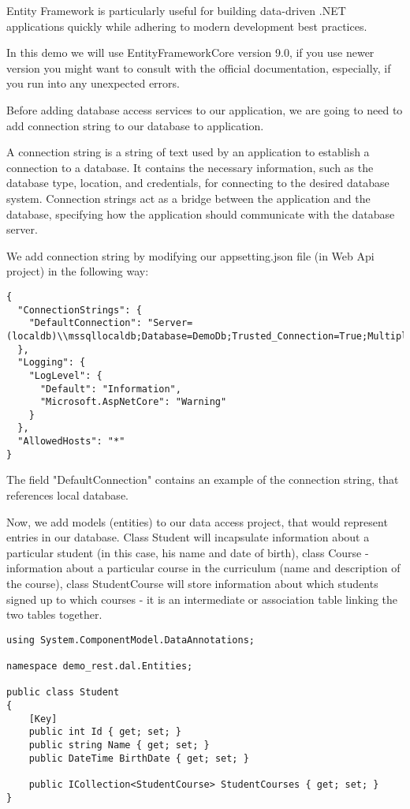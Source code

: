 Entity Framework is particularly useful for building data-driven .NET applications quickly while adhering to modern development best practices.

In this demo we will use EntityFrameworkCore version 9.0, if you use newer version you might want to consult with the official documentation, especially, if you run into any unexpected errors.

Before adding database access services to our application, we are going to need to add connection string to our database to application.

A connection string is a string of text used by an application to establish a connection to a database. It contains the necessary information, such as the database type, location, and credentials, for connecting to the desired database system. Connection strings act as a bridge between the application and the database, specifying how the application should communicate with the database server.

We add connection string by modifying our appsetting.json file (in Web Api project) in the following way:

\begin{lstlisting}
{
  "ConnectionStrings": {
    "DefaultConnection": "Server=(localdb)\\mssqllocaldb;Database=DemoDb;Trusted_Connection=True;MultipleActiveResultSets=true"
  },
  "Logging": {
    "LogLevel": {
      "Default": "Information",
      "Microsoft.AspNetCore": "Warning"
    }
  },
  "AllowedHosts": "*"
}
\end{lstlisting}

The field "DefaultConnection" contains an example of the connection string, that references local database.

Now, we add models (entities) to our data access project, that would represent entries in our database. Class Student will incapsulate information about a particular student (in this case, his name and date of birth), class Course - information about a particular course in the curriculum (name and description of the course), class StudentCourse will store information about which students signed up to which courses - it is an intermediate or association table linking the two tables together.

\begin{lstlisting}
using System.ComponentModel.DataAnnotations;

namespace demo_rest.dal.Entities;

public class Student
{
    [Key]
    public int Id { get; set; }
    public string Name { get; set; }
    public DateTime BirthDate { get; set; }

    public ICollection<StudentCourse> StudentCourses { get; set; }
}

\end{lstlisting}

